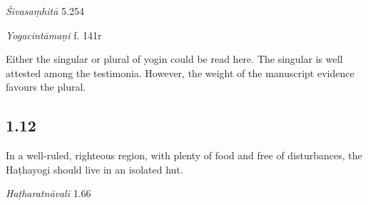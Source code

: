 \begin{ekdosis}
\begin{sources}[hp01_011]
\emph{Śivasaṃhitā} 5.254

\begin{versinnote}
\tl{\var{haṭhavidyā ... icchatā ] \emph{om.} III–XII, XIV}\\!}
\end{versinnote}

\end{sources}

\begin{testimonia}[hp01_011]
\emph{Yogacintāmaṇi} f. 141r %

\begin{versinnote}
\end{versinnote}

\end{testimonia}

\begin{philcomm}[hp01_011]        
Either the singular or plural of yogin could be read here. The singular is well attested among the testimonia. However, the weight of the manuscript evidence favours the plural.  
\end{philcomm}

\subsection*{1.12}
\begin{translation}[hp01_012]
In a well-ruled, righteous region, with plenty of food and free of disturbances, the Haṭhayogi should live in an isolated hut.
\end{translation}

\begin{sources}[hp01_012]
\end{sources}

\begin{testimonia}[hp01_012]
\emph{Haṭharatnāvalī} 1.66

\begin{versinnote}
\end{versinnote}


\end{testimonia}
\end{ekdosis}
